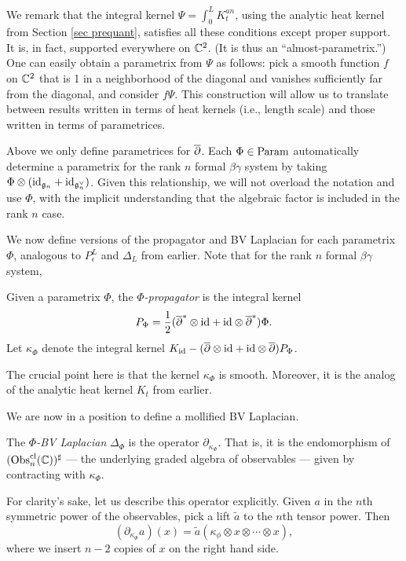 We remark that the integral kernel $\Psi = \int_0^L K_t^{an}$, using the analytic heat kernel from Section \ref{sec prequant},
satisfies all these conditions except proper support. 
It is, in fact, supported everywhere on $\mathbb C^2$.
(It is thus an ``almost-parametrix.'')
One can easily obtain a parametrix from $\Psi$ as follows: 
pick a smooth function $f$ on $\mathbb C^2$ that is 1 in a neighborhood of the diagonal and vanishes sufficiently far from the diagonal,
and consider $f \Psi$.
This construction will allow us to translate between results written in terms of heat kernels (i.e., length scale)
and those written in terms of parametrices.

\begin{rmk}
Above we only define parametrices for $\overline{\partial}$. 
Each $\Phi \in {\rm Param}$ automatically determine a parametrix for the rank $n$ formal $\beta\gamma$ system
by taking $\Phi \otimes ({\rm id}_{\mathfrak{g}_n} + {\rm id}_{\mathfrak{g}_n^\vee})$.
Given this relationship, we will not overload the notation and use $\Phi$, 
with the implicit understanding that the algebraic factor is included in the rank $n$ case.
\end{rmk}

We now define versions of the propagator and BV Laplacian for each parametrix $\Phi$,
analogous to $P_\epsilon^L$ and $\Delta_L$ from earlier.
Note that for the rank $n$ formal $\beta\gamma$ system, 

\begin{dfn}
Given a parametrix $\Phi$, the \emph{$\Phi$-propagator} is the integral kernel
\[
P_{\Phi}=\frac{1}{2} (\overline{\partial}^* \otimes {\rm id} + {\rm id} \otimes \overline{\partial}^*)\Phi.
\]
Let $\kappa_\Phi$ denote the integral kernel $K_{\rm id} - (\overline{\partial} \otimes {\rm id} + {\rm id} \otimes \overline{\partial})P_\Phi$.
\end{dfn}

The crucial point here is that the kernel $\kappa_\Phi$ is smooth. Moreover, it is the analog of the analytic heat kernel $K_t$ from earlier.

We are now in a position to define a mollified BV Laplacian.

\begin{dfn}
The \emph{$\Phi$-BV Laplacian} $\Delta_\Phi$ is the operator $\partial_{\kappa_\Phi}$.
That is, it is the endomorphism of $({\rm Obs}^{\rm cl}_n(\mathbb C))^\sharp$ --- the underlying graded algebra of observables --- given by contracting with $\kappa_\Phi$. 
\end{dfn}

For clarity's sake, let us describe this operator explicitly.
Given $a$ in the $n$th symmetric power of the observables, pick a lift $\tilde{a}$ to the $n$th tensor power.
Then 
\[
(\partial_{\kappa_\Phi}a)(x) = \tilde{a}(\kappa_\phi \otimes x \otimes \cdots \otimes x),
\]
where we insert $n-2$ copies of $x$ on the right hand side.

